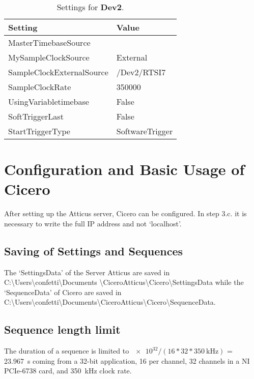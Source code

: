 \begin{table}[H]
	\centering
	\caption{Settings for \textbf{Dev2}.}
	\label{tab:settings dev2}
	\begin{tabular}{*{2}{|l}|}
		\hline
		\textbf{Setting}          & Value           \\ \hline
		MasterTimebaseSource      &                 \\ \hline
		MySampleClockSource       & External        \\ \hline
		SampleClockExternalSource & /Dev2/RTSI7     \\ \hline
		SampleClockRate           & 350000          \\ \hline
		UsingVariabletimebase     & False           \\ \hline
		SoftTriggerLast           & False           \\ \hline
		StartTriggerType          & SoftwareTrigger \\ \hline
	\end{tabular}        	
\end{table}

\section{Configuration and Basic Usage of Cicero}\label{sec:Cicero, Configuration and Basic Usage of Cicero}
After setting up the Atticus server, Cicero can be configured. In step 3.c. it is necessary to write the full IP address and not `localhost'.

\subsection*{Saving of Settings and Sequences}\label{sec:Cicero, Saving of Settings and Sequences}
The `SettingsData' of the Server Atticus are saved in C:\textbackslash Users\textbackslash confetti\textbackslash Documents \textbackslash Cicero\textunderscore Atticus\textbackslash Cicero\textbackslash SettingsData while the `SequenceData' of Cicero are saved in C:\textbackslash Users\textbackslash confetti\textbackslash Documents\textbackslash Cicero\textunderscore Atticus\textbackslash Cicero\textbackslash SequenceData.

\subsection*{Sequence length limit}\label{sec:cicero, Sequence length limit}
The duration of a sequence is limited to $\num[exponent-base=2]{e32}/(16*32*\SI{350}{\kilo\hertz})$ = \SI{23.967}{\second} coming from a 32-bit application, \SI{16}{\bit} per channel, 32 channels in a NI PCIe-6738 card, and \SI{350}{\kilo\hertz} clock rate.